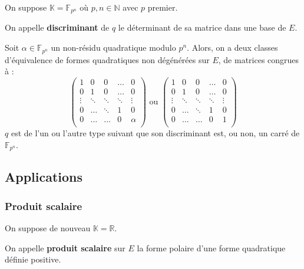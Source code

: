 	On suppose $\mathbb{K} = \mathbb{F}_{p^n}$ où $p, n \in \mathbb{N}$ avec $p$ premier.


	\begin{definition}
		On appelle \textbf{discriminant} de $q$ le déterminant de sa matrice dans une base de $E$.
	\end{definition}

	\begin{theorem}
		Soit $\alpha \in \mathbb{F}_{p^n}$ un non-résidu quadratique modulo $p^n$. Alors, on a deux classes d'équivalence de formes quadratiques non dégénérées sur $E$, de matrices congrues à :
		\[
			\begin{pmatrix}
				1 & 0 & 0 & \dots & 0 \\
				0 & 1 & 0 & \dots & 0 \\
				\vdots & \ddots & \ddots & \ddots & \vdots \\
				0 & \dots & \ddots & 1 & 0 \\
				0 & \dots & \dots & 0 & \alpha \\
			\end{pmatrix}
			\text{ ou }
			\begin{pmatrix}
				1 & 0 & 0 & \dots & 0 \\
				0 & 1 & 0 & \dots & 0 \\
				\vdots & \ddots & \ddots & \ddots & \vdots \\
				0 & \dots & \ddots & 1 & 0 \\
				0 & \dots & \dots & 0 & 1 \\
			\end{pmatrix}
		\]
		$q$ est de l'un ou l'autre type suivant que son discriminant est, ou non, un carré de $\mathbb{F}_{p^n}$.
	\end{theorem}

	\subsection{Applications}

	\subsubsection{Produit scalaire}

	On suppose de nouveau $\mathbb{K} = \mathbb{R}$.


	\begin{definition}
		On appelle \textbf{produit scalaire} sur $E$ la forme polaire d'une forme quadratique définie positive.
	\end{definition}

